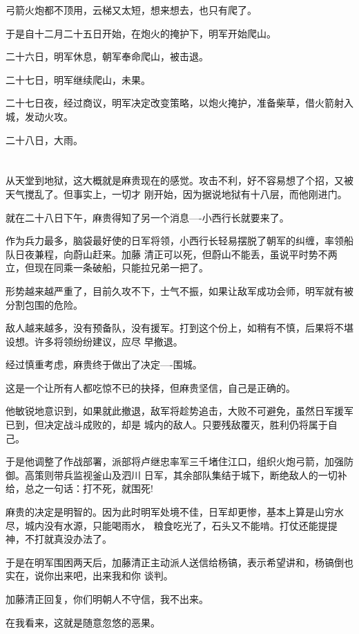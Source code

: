 \documentclass[11pt,a4paper,onecolumn]{article}
\begin{document}
弓箭火炮都不顶用，云梯又太短，想来想去，也只有爬了。

于是自十二月二十五日开始，在炮火的掩护下，明军开始爬山。

二十六日，明军休息，朝军奉命爬山，被击退。

二十七日，明军继续爬山，未果。

二十七日夜，经过商议，明军决定改变策略，以炮火掩护，准备柴草，借火箭射入城，发动火攻。

二十八日，大雨。

\section[\thesection]{}

从天堂到地狱，这大概就是麻贵现在的感觉。攻击不利，好不容易想了个招，又被天气搅乱了。但事实上，一切才
刚开始，因为据说地狱有十八层，而他刚进门。

就在二十八日下午，麻贵得知了另一个消息----小西行长就要来了。

作为兵力最多，脑袋最好使的日军将领，小西行长轻易摆脱了朝军的纠缠，率领船队日夜兼程，向蔚山赶来。加藤
清正可以死，但蔚山不能丢，虽说平时势不两立，但现在同乘一条破船，只能拉兄弟一把了。

形势越来越严重了，目前久攻不下，士气不振，如果让敌军成功会师，明军就有被分割包围的危险。

敌人越来越多，没有预备队，没有援军。打到这个份上，如稍有不慎，后果将不堪设想。许多将领纷纷建议，应尽
早撤退。

经过慎重考虑，麻贵终于做出了决定----围城。

这是一个让所有人都吃惊不已的抉择，但麻贵坚信，自己是正确的。

他敏锐地意识到，如果就此撤退，敌军将趁势追击，大败不可避免，虽然日军援军已到，但决定战斗成败的，却是
城内的敌人。只要残敌覆灭，胜利仍将属于自己。

于是他调整了作战部署，派部将卢继忠率军三千堵住江口，组织火炮弓箭，加强防御。高策则带兵监视釜山及泗川
日军，其余部队集结于城下，断绝敌人的一切补给，总之一句话：打不死，就围死!

麻贵的决定是明智的。因为此时明军处境不佳，日军却更惨，基本上算是山穷水尽，城内没有水源，只能喝雨水，
粮食吃光了，石头又不能啃。打仗还能提提神，不打就真没办法了。

于是在明军围困两天后，加藤清正主动派人送信给杨镐，表示希望讲和，杨镐倒也实在，说你出来吧，出来我和你
谈判。

加藤清正回复，你们明朝人不守信，我不出来。

在我看来，这就是随意忽悠的恶果。
\end{document}
